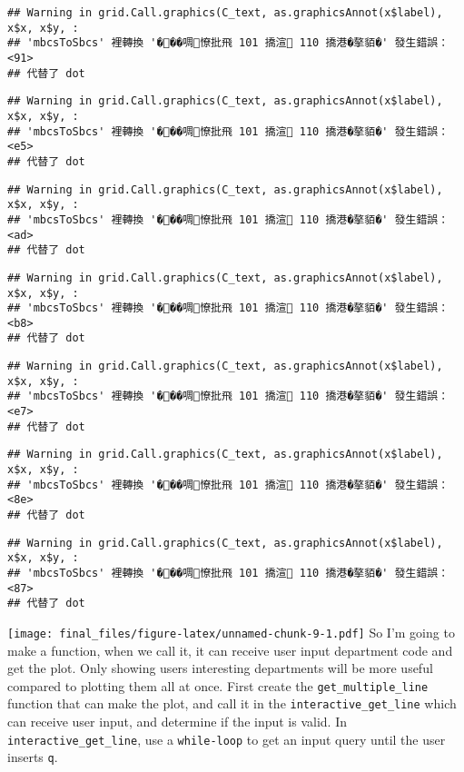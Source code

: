 \documentclass[
]{article}
\begin{document}
\begin{verbatim}
## Warning in grid.Call.graphics(C_text, as.graphicsAnnot(x$label), x$x, x$y, :
## 'mbcsToSbcs' 裡轉換 '���啁憭批飛 101 撟渲 110 撟港�摮貊�' 發生錯誤：<91>
## 代替了 dot
\end{verbatim}

\begin{verbatim}
## Warning in grid.Call.graphics(C_text, as.graphicsAnnot(x$label), x$x, x$y, :
## 'mbcsToSbcs' 裡轉換 '���啁憭批飛 101 撟渲 110 撟港�摮貊�' 發生錯誤：<e5>
## 代替了 dot
\end{verbatim}

\begin{verbatim}
## Warning in grid.Call.graphics(C_text, as.graphicsAnnot(x$label), x$x, x$y, :
## 'mbcsToSbcs' 裡轉換 '���啁憭批飛 101 撟渲 110 撟港�摮貊�' 發生錯誤：<ad>
## 代替了 dot
\end{verbatim}

\begin{verbatim}
## Warning in grid.Call.graphics(C_text, as.graphicsAnnot(x$label), x$x, x$y, :
## 'mbcsToSbcs' 裡轉換 '���啁憭批飛 101 撟渲 110 撟港�摮貊�' 發生錯誤：<b8>
## 代替了 dot
\end{verbatim}

\begin{verbatim}
## Warning in grid.Call.graphics(C_text, as.graphicsAnnot(x$label), x$x, x$y, :
## 'mbcsToSbcs' 裡轉換 '���啁憭批飛 101 撟渲 110 撟港�摮貊�' 發生錯誤：<e7>
## 代替了 dot
\end{verbatim}

\begin{verbatim}
## Warning in grid.Call.graphics(C_text, as.graphicsAnnot(x$label), x$x, x$y, :
## 'mbcsToSbcs' 裡轉換 '���啁憭批飛 101 撟渲 110 撟港�摮貊�' 發生錯誤：<8e>
## 代替了 dot
\end{verbatim}

\begin{verbatim}
## Warning in grid.Call.graphics(C_text, as.graphicsAnnot(x$label), x$x, x$y, :
## 'mbcsToSbcs' 裡轉換 '���啁憭批飛 101 撟渲 110 撟港�摮貊�' 發生錯誤：<87>
## 代替了 dot
\end{verbatim}

\texttt{[image: final\_files/figure-latex/unnamed-chunk-9-1.pdf]} So I'm
going to make a function, when we call it, it can receive user input
department code and get the plot. Only showing users interesting
departments will be more useful compared to plotting them all at once.
First create the \texttt{get\_multiple\_line} function that can make the
plot, and call it in the \texttt{interactive\_get\_line} which can
receive user input, and determine if the input is valid. In
\texttt{interactive\_get\_line}, use a \texttt{while-loop} to get an
input query until the user inserts \texttt{q}.
\end{document}
